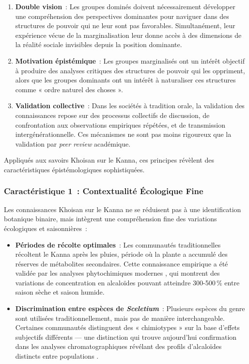 \documentclass[12pt,a4paper,twoside]{book}
\begin{document}
\begin{enumerate}
\item \textbf{Double vision}~: Les groupes dominés doivent nécessairement développer une compréhension des perspectives dominantes pour naviguer dans des structures de pouvoir qui ne leur sont pas favorables. Simultanément, leur expérience vécue de la marginalisation leur donne accès à des dimensions de la réalité sociale invisibles depuis la position dominante.

\item \textbf{Motivation épistémique}~: Les groupes marginalisés ont un intérêt objectif à produire des analyses critiques des structures de pouvoir qui les oppriment, alors que les groupes dominants ont un intérêt à naturaliser ces structures comme « ordre naturel des choses ».

\item \textbf{Validation collective}~: Dans les sociétés à tradition orale, la validation des connaissances repose sur des processus collectifs de discussion, de confrontation aux observations empiriques répétées, et de transmission intergénérationnelle. Ces mécanismes ne sont pas moins rigoureux que la validation par \textit{peer review} académique.
\end{enumerate}

Appliqués aux savoirs Khoisan sur le Kanna, ces principes révèlent des caractéristiques épistémologiques sophistiquées.

\subsubsection{Caractéristique 1~: Contextualité Écologique Fine}

Les connaissances Khoisan sur le Kanna ne se réduisent pas à une identification botanique binaire, mais intègrent une compréhension fine des variations écologiques et saisonnières~:

\begin{itemize}
\item \textbf{Périodes de récolte optimales}~: Les communautés traditionnelles récoltent le Kanna après les pluies, période où la plante a accumulé des réserves de métabolites secondaires. Cette connaissance empirique a été validée par les analyses phytochimiques modernes \parencite{chen2019,shikanga2012}, qui montrent des variations de concentration en alcaloïdes pouvant atteindre 300-500\,\% entre saison sèche et saison humide.

\item \textbf{Discrimination entre espèces de \textit{Sceletium}}~: Plusieurs espèces du genre sont utilisées traditionnellement, mais pas de manière interchangeable. Certaines communautés distinguent des « chimiotypes » sur la base d'effets subjectifs différents --- une distinction qui trouve aujourd'hui confirmation dans les analyses chromatographiques révélant des profils d'alcaloïdes distincts entre populations \parencite{krstenansky2016}.
\end{itemize}
\end{document}
